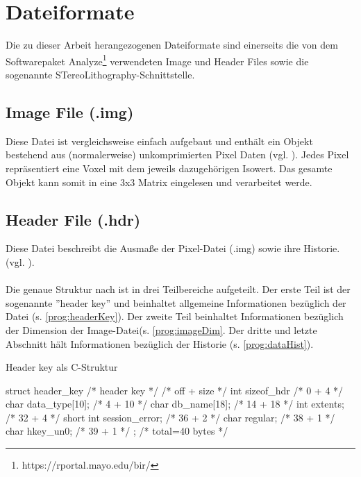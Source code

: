 \section{Dateiformate}
\label{sec:DateiEinf}
Die zu dieser Arbeit herangezogenen Dateiformate sind einerseits die von dem Softwarepaket Analyze\footnote{https://rportal.mayo.edu/bir/} verwendeten Image und Header Files sowie die sogenannte STereoLithography-Schnittstelle. 

\subsection{Image File (.img)}
Diese Datei ist vergleichsweise einfach aufgebaut und enthält ein Objekt bestehend aus (normalerweise) unkomprimierten Pixel Daten (vgl. \citep{AnalyzeFormat}). Jedes Pixel repräsentiert eine Voxel mit dem jeweils dazugehörigen Isowert. Das gesamte Objekt kann somit in eine 3x3 Matrix eingelesen und verarbeitet werde.

\subsection{Header File (.hdr)}
\label{sec:DateiHead}
Diese Datei beschreibt die Ausmaße der Pixel-Datei (.img) sowie ihre Historie. (vgl. \citep{AnalyzeFormat}). \\\\
Die genaue Struktur nach \citep{AnalyzeFormat} ist in drei Teilbereiche aufgeteilt. Der erste Teil ist der sogenannte ''header key'' und beinhaltet allgemeine Informationen bezüglich der Datei (s. \ref{prog:headerKey}). Der zweite Teil beinhaltet Informationen bezüglich der Dimension der Image-Datei(s. \ref{prog:imageDim}. Der dritte und letzte Abschnitt hält Informationen bezüglich der Historie (s. \ref{prog:dataHist}).

\begin{program}[H]
	\caption{Header key als C-Struktur \citep{AnalyzeFormat}}
	\label{prog:headerKey}
	\begin{CCode}
struct header_key /* header key */
{ /* off + size */
	int sizeof_hdr /* 0 + 4 */
	char data_type[10]; /* 4 + 10 */
	char db_name[18]; /* 14 + 18 */
	int extents; /* 32 + 4 */
	short int session_error; /* 36 + 2 */
	char regular; /* 38 + 1 */
	char hkey_un0; /* 39 + 1 */
}; /* total=40 bytes */ 
	\end{CCode}
\end{program}

